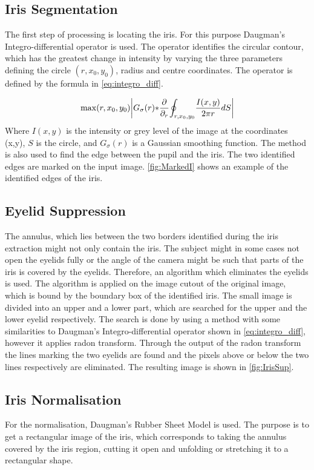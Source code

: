 \subsection{Iris Segmentation}
The first step of processing is locating the iris. For this purpose Daugman's Integro-differential operator is used. The operator identifies the circular contour, which has the greatest change in intensity by varying the three parameters defining the circle $(r,x_0,y_0)$, radius and centre coordinates. The operator is defined by the formula in \autoref{eq:integro_diff}.

\begin{equation}\label{eq:integro_diff}
	\max(r,x_{0},y_{0}){\left|G_{\sigma}{(r)*}{\partial\over \partial_{r}}{\oint_{r,x_{0},y_{0}}}{{I(x,y)\over 2\pi r}dS}\right|}
\end{equation}
Where $I(x,y)$ is the intensity or grey level of the image at the coordinates (x,y), $S$ is the circle, and $G_{\sigma}{(r)}$ is a Gaussian smoothing function.
The method is also used to find the edge between the pupil and the iris. The two identified edges are marked on the input image. \autoref{fig:MarkedI} shows an example of the identified edges of the iris. 

\subsection{Eyelid Suppression}
The annulus, which lies between the two borders identified during the iris extraction might not only contain the iris. The subject might in some cases not open the eyelids fully or the angle of the camera might be such that parts of the iris is covered by the eyelids. Therefore, an algorithm which eliminates the eyelids is used. 
The algorithm is applied on the image cutout of the original image, which is bound by the boundary box of the identified iris. The small image is divided into an upper and a lower part, which are searched for the upper and the lower eyelid respectively. The search is done by using a method with some similarities to Daugman's Integro-differential operator shown in \autoref{eq:integro_diff}, however it applies radon transform. Through the output of the radon transform the lines marking the two eyelids are found and the pixels above or below the two lines respectively are eliminated. The resulting image is shown in \autoref{fig:IrisSup}.

\subsection{Iris Normalisation}
\label{sec:irisnorm}
For the normalisation, Daugman's Rubber Sheet Model is used. The purpose is to get a rectangular image of the iris, which corresponds to taking the annulus covered by the iris region, cutting it open and unfolding or stretching it to a rectangular shape. 

